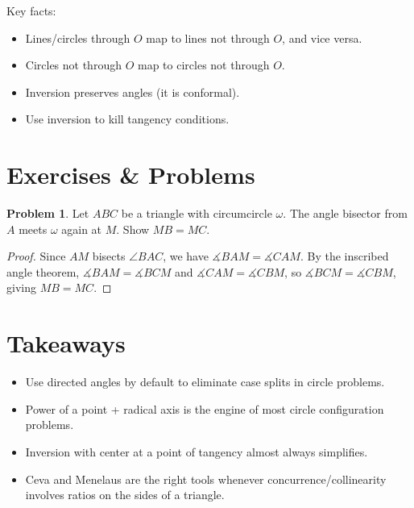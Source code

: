 \documentclass[11pt, letterpaper]{article}
\theoremstyle{definition}
\newtheorem{problem}{Problem}[section]
\theoremstyle{remark}
\newcommand{\dang}{\measuredangle}          %
\begin{document}
Key facts:
\begin{itemize}
  \item Lines/circles through $O$ map to lines not through $O$, and vice versa.
  \item Circles not through $O$ map to circles not through $O$.
  \item Inversion preserves angles (it is conformal).
  \item Use inversion to kill tangency conditions.
\end{itemize}

\section{Exercises \& Problems}

\begin{problem}
  Let $ABC$ be a triangle with circumcircle $\omega$. The angle bisector from
  $A$ meets $\omega$ again at $M$. Show $MB = MC$.
\end{problem}

\begin{proof}
  Since $AM$ bisects $\angle BAC$, we have $\dang BAM = \dang CAM$.
  By the inscribed angle theorem, $\dang BAM = \dang BCM$ and
  $\dang CAM = \dang CBM$, so $\dang BCM = \dang CBM$, giving $MB = MC$.
\end{proof}

\section{Takeaways}

\begin{itemize}
  \item Use directed angles by default to eliminate case splits in circle problems.
  \item Power of a point + radical axis is the engine of most circle configuration problems.
  \item Inversion with center at a point of tangency almost always simplifies.
  \item Ceva and Menelaus are the right tools whenever concurrence/collinearity
        involves ratios on the sides of a triangle.
\end{itemize}
\end{document}
